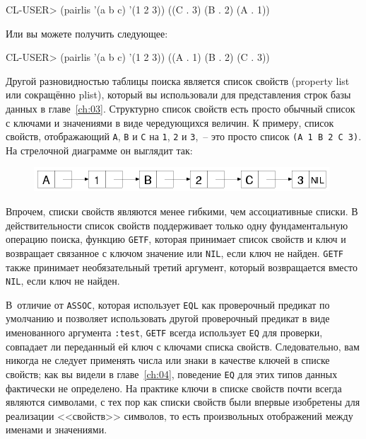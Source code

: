 \begin{myverb}
CL-USER> (pairlis '(a b c) '(1 2 3))
((C . 3) (B . 2) (A . 1))
\end{myverb}

Или вы можете получить следующее:

\begin{myverb}
CL-USER> (pairlis '(a b c) '(1 2 3))
((A . 1) (B . 2) (C . 3))
\end{myverb}

Другой разновидностью таблицы поиска является список свойств (property list или сокращённо
plist), который вы использовали для представления строк базы данных в главе~\ref{ch:03}.
Структурно список свойств есть просто обычный список с ключами и значениями в виде
чередующихся величин. К примеру, список свойств, отображающий \lstinline{A}, \lstinline{B} и
\lstinline{C} на \lstinline{1}, \lstinline{2} и \lstinline{3},~-- это просто список \lstinline{(A 1 B 2 C 3)}. На
стрелочной диаграмме он выглядит так:

\begin{figure}[h]
  \centering
  \includegraphics[scale=0.6]{images/plist-abc-123.png}
\end{figure}

Впрочем, списки свойств являются менее гибкими, чем ассоциативные списки. В
действительности список свойств поддерживает только одну фундаментальную операцию поиска,
функцию \lstinline{GETF}, которая принимает список свойств и ключ и возвращает связанное с
ключом значение или \lstinline{NIL}, если ключ не найден. \lstinline{GETF} также принимает
необязательный третий аргумент, который возвращается вместо \lstinline{NIL}, если ключ не
найден.

В~отличие от \lstinline{ASSOC}, которая использует \lstinline{EQL} как проверочный предикат по
умолчанию и позволяет использовать другой проверочный предикат в виде именованного
аргумента \lstinline{:test}, \lstinline{GETF} всегда использует \lstinline{EQ} для проверки, совпадает ли
переданный ей ключ с ключами списка свойств. Следовательно, вам никогда не следует
применять числа или знаки в качестве ключей в списке свойств; как вы видели в
главе~\ref{ch:04}, поведение \lstinline{EQ} для этих типов данных фактически не определено. На
практике ключи в списке свойств почти всегда являются символами, с тех пор как списки
свойств были впервые изобретены для реализации <<свойств>> символов, то есть произвольных
отображений между именами и значениями.

